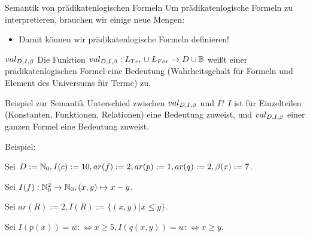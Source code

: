 \begin{frame}{Semantik von prädikatenlogischen Formeln}
	Um prädikatenlogische Formeln zu interpretieren, brauchen wir einige neue Mengen:
	
	\begin{itemize}
		\pitem Interpretation $(D, I)$\ip, bestehend aus...
		\begin{itemize}
			\pitem Universum $D \neq \emptyset$ mit...
			\begin{itemize}
				\pitem $I(c_i) \in D$ für $c_i \in Const_{PL}$
				\pitem $I(f_i) : D^{ar(f_i)} \rightarrow D$ für $f_i \in Fun_{PL}$
				\pitem $I(R_i) \subseteq D^{ar(R_i)}$ für $R_i \in Rel_{PL}$
				\pitem $I$ weißt also den Komponenten Bedeutungen zu, ``definiert diese''
			\end{itemize}
			
			\pitem Variablenbelegung $\beta : Var_{PL} \rightarrow D$, z.B. $\beta(x) := 3, \beta(y) := 11$
			\begin{itemize}
				\pitem $\beta$ definiert also Variablenwerte
			\end{itemize}
		\end{itemize}
		
		\bp
		
		\item Damit können wir prädikatenlogische Formeln definieren!
	\end{itemize}
	
	\p
	
	\begin{block}{$val_{D,I,\beta}$}
		Die Funktion $val_{D,I,\beta} : L_{Ter} \cup L_{For} \rightarrow D \cup \mathbb{B}$ \ip weißt einer prädikatenlogischen Formel eine Bedeutung \ip (Wahrheitsgehalt für Formeln und Element des Universums für Terme) zu.
	\end{block}
\end{frame}


\begin{frame}{Beispiel zur Semantik}
	Unterschied zwischen $val_{D,I,\beta}$ und $I$? \pause $I$ ist für Einzelteilen (Konstanten, Funktionen, Relationen) eine Bedeutung zuweist, und $val_{D,I,\beta}$ einer ganzen Formel eine Bedeutung zuweist.\pause\vertspace
	
	Beispiel:\vertspace\ip
	
	Sei $D := \mathbb{N}_0, I(c) := 10, ar(f) := 2, ar(p) := 1, ar(q) := 2, \beta(x) := 7$.\ip
	
	Sei $I(f) : \mathbb{N}_0^2 \rightarrow \mathbb{N}_0, (x,y) \mapsto x-y$.\ip
	
	Sei $ar(R) := 2, I(R) := \{(x,y) | x \leq y\}$.\ip
	
	Sei $I(p(x)) = w :\Leftrightarrow x \geq 5, I(q(x,y)) = w :\Leftrightarrow x \geq y$.
\end{frame}

